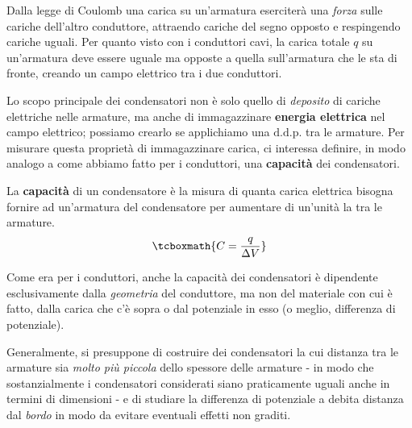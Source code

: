 Dalla legge di Coulomb una carica su un'armatura eserciterà una \textit{forza} sulle cariche dell'altro conduttore, attraendo cariche del segno opposto e respingendo cariche uguali. Per quanto visto con i conduttori cavi, la carica totale $q$ su un'armatura deve essere uguale ma opposte a quella sull'armatura che le sta di fronte, creando un campo elettrico tra i due conduttori.

Lo scopo principale dei condensatori non è solo quello di \textit{deposito} di cariche elettriche nelle armature, ma anche di immagazzinare \textbf{energia elettrica} nel campo elettrico; possiamo crearlo se applichiamo una $\textrm{d.d.p.}$ tra le armature. Per misurare questa proprietà di immagazzinare carica, ci interessa definire, in modo analogo a come abbiamo fatto per i conduttori, una \textbf{capacità} dei condensatori.
\begin{define}
	La \textbf{capacità} di un condensatore è la misura di quanta carica elettrica bisogna fornire ad un'armatura del condensatore per aumentare di un'unità la \ddp tra le armature.
	\begin{equation}
		\tcboxmath{C=\frac{q}{\Delta V}}
	\end{equation}
\end{define}
Come era per i conduttori, anche la capacità dei condensatori è dipendente esclusivamente dalla \textit{geometria} del conduttore, ma non del materiale con cui è fatto, dalla carica che c'è sopra o dal potenziale in esso (o meglio, differenza di potenziale).
\begin{observe}
	Generalmente, si presuppone di costruire dei condensatori la cui distanza tra le armature sia \textit{molto più piccola} dello spessore delle armature - in modo che sostanzialmente i condensatori considerati siano praticamente uguali anche in termini di dimensioni - e di studiare la differenza di potenziale a debita distanza dal \textit{bordo} in modo da evitare eventuali effetti non graditi.
\end{observe}
